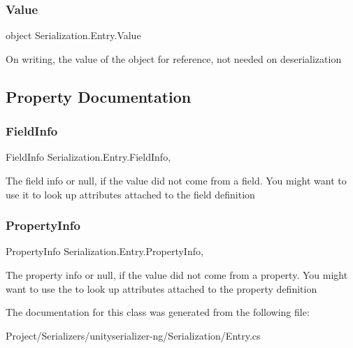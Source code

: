 \subsubsection{\texorpdfstring{Value}{Value}}
{\footnotesize\ttfamily object Serialization.\+Entry.\+Value}



On writing, the value of the object for reference, not needed on deserialization 



\subsection{Property Documentation}
\mbox{\label{class_serialization_1_1_entry_ac9c4d67292047b6a3f9a3d3fcdccb09e}} 
\subsubsection{\texorpdfstring{Field\+Info}{FieldInfo}}
{\footnotesize\ttfamily Field\+Info Serialization.\+Entry.\+Field\+Info\hspace{0.3cm}{\ttfamily [get]}, {\ttfamily [set]}}



The field info or null, if the value did not come from a field. You might want to use it to look up attributes attached to the field definition 

\mbox{\label{class_serialization_1_1_entry_a079414059819b92c873921247bc0686b}} 
\subsubsection{\texorpdfstring{Property\+Info}{PropertyInfo}}
{\footnotesize\ttfamily Property\+Info Serialization.\+Entry.\+Property\+Info\hspace{0.3cm}{\ttfamily [get]}, {\ttfamily [set]}}



The property info or null, if the value did not come from a property. You might want to use the to look up attributes attached to the property definition 



The documentation for this class was generated from the following file\+:\begin{DoxyCompactItemize}
\item 
Project/\+Serializers/unityserializer-\/ng/\+Serialization/Entry.\+cs\end{DoxyCompactItemize}
